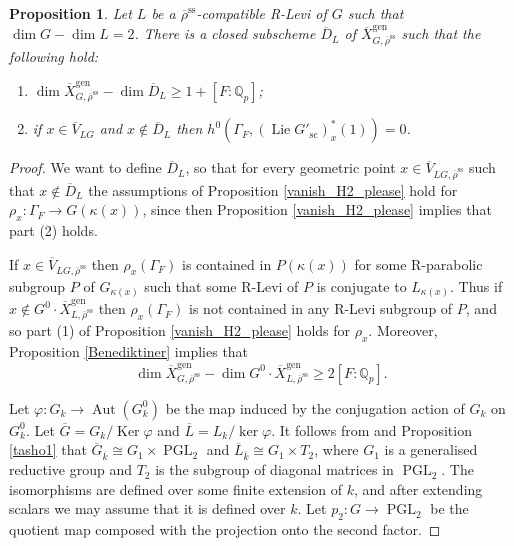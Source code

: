 \documentclass{amsart}
\newtheorem{prop}{Proposition}[section]
\theoremstyle{definition}
\theoremstyle{remark}
\DeclareMathOperator{\Aut}{Aut}
\DeclareMathOperator{\Ker}{Ker}
\newcommand{\Qp}{\mathbb {Q}_p}
\newcommand{\Vbar}{\overline{{V}}}
\newcommand{\rhobar}{\overline{\rho}}
\newcommand{\gen}{\mathrm{gen}}
\DeclareMathOperator{\PGL}{PGL}
\newcommand{\Xbar}{\overline{X}}
\DeclareMathOperator{\Lie}{Lie}
\newcommand{\kbar}{\overline{k}}
\newcommand{\rhobarss}{\rhobar^{\mathrm{ss}}}
\newcommand{\sic}{\operatorname{sc}}
\begin{document}
\begin{prop}\label{alt_yeah}
Let $L$ be a $\rhobarss$-compatible R-Levi of $G$ such that $\dim G -\dim L=2$.  There is a closed subscheme 
$\overline{D}_L$ of $\Xbar^{\gen}_{G, \rhobarss}$ such that the following hold: 
\begin{enumerate}
\item $\dim \Xbar^{\gen}_{G, \rhobarss} - \dim \overline{D}_L\ge 1+[F:\Qp]$;
\item if $x\in \Vbar_{LG}$ and $x\not\in \overline{D}_L$ then $h^0(\Gamma_F, (\Lie G'_{\sic})^*_x(1))=0$.
\end{enumerate}
\end{prop}
\begin{proof} We want to define $\overline{D}_L$, so that for every geometric point 
$x\in \Vbar_{LG, \rhobarss}$ such that $x\not \in \overline{D}_L$ the assumptions of
Proposition \ref{vanish_H2_please} hold for $\rho_x: \Gamma_F \rightarrow G(\kappa(x))$, 
since then Proposition \ref{vanish_H2_please} implies that part (2) holds. 

If $x\in \Vbar_{LG, \rhobarss}$ then $\rho_x(\Gamma_F)$ is contained in 
$P(\kappa(x))$ for some R-parabolic subgroup $P$ of $G_{\kappa(x)}$ such that some
R-Levi of $P$ is conjugate to $L_{\kappa(x)}$. Thus if $x\not\in G^0\cdot \Xbar^{\gen}_{L, \rhobarss}$
then $\rho_x(\Gamma_F)$ is not contained in any R-Levi subgroup of $P$, and so part (1) 
of Proposition \ref{vanish_H2_please} holds for $\rho_x$. Moreover, Proposition \ref{Benediktiner}
implies that 
\begin{equation}\label{codim_L}
\dim \Xbar^{\gen}_{G, \rhobarss} - \dim G^0\cdot \Xbar^{\gen}_{L, \rhobarss} \ge 2 [F:\Qp].
\end{equation}

Let $\varphi: G_k \rightarrow \Aut(G^0_k)$ be the map induced by the conjugation 
action of $G_k$ on $G^0_k$. Let $\overline{G}= G_k/\Ker \varphi$ and $\overline{L}= L_k/\ker \varphi$.  It follows from \cite[Theorem 7.1.9]{bcnrd} 
and Proposition \ref{tasho1} that $\overline{G}_{\kbar}\cong G_1 \times \PGL_2$ and 
$\overline{L}_{\kbar} \cong G_1\times T_2$, where $G_1$ is a 
generalised reductive group and $T_2$ is the subgroup of diagonal matrices in $\PGL_2$. The isomorphisms are defined over some finite extension of $k$, and after extending 
scalars we may assume that it is defined over $k$. Let $p_2: G\rightarrow \PGL_2$ be the 
quotient map composed with the projection onto the second factor. 


\end{proof}
\end{document}
